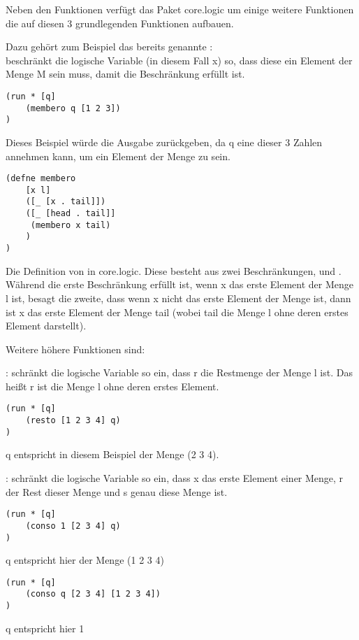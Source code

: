 Neben den Funktionen  verfügt das Paket core.logic um einige weitere Funktionen die auf diesen 3 grundlegenden Funktionen aufbauen.

Dazu gehört zum Beispiel das bereits genannte :\\
 beschränkt die logische Variable (in diesem Fall x) so, dass diese ein Element der Menge M sein muss, damit die Beschränkung erfüllt ist.\\
\begin{lstlisting}
(run * [q]
	(membero q [1 2 3])
)
\end{lstlisting}
Dieses Beispiel würde die Ausgabe  zurückgeben, da q eine dieser 3 Zahlen annehmen kann, um ein Element der Menge \code{[1 2 3]} zu sein.

\begin{lstlisting}
(defne membero
	[x l]
	([_ [x . tail]])
	([_ [head . tail]]
	 (membero x tail)
	)
)
\end{lstlisting}

Die Definition von  in core.logic. Diese besteht aus zwei Beschränkungen, \code{([\_ [x . tail]])} und . Während die erste Beschränkung erfüllt ist, wenn x das erste Element der Menge l ist, besagt die zweite, dass wenn x nicht das erste Element der Menge ist, dann ist x das erste Element der Menge tail (wobei tail die Menge l ohne deren erstes Element darstellt).

Weitere höhere Funktionen sind:
\begin{description}
\item{:}
 schränkt die logische Variable so ein, dass r die Restmenge der Menge l ist. Das heißt r ist die Menge l ohne deren erstes Element.
\begin{lstlisting}
(run * [q]
	(resto [1 2 3 4] q)
)
\end{lstlisting}
q entspricht in diesem Beispiel der Menge (2 3 4).
\item{:}
 schränkt die logische Variable so ein, dass x das erste Element einer Menge, r der Rest dieser Menge und s genau diese Menge ist.

\begin{lstlisting}
(run * [q]
	(conso 1 [2 3 4] q)
)
\end{lstlisting}
q entspricht hier der Menge (1 2 3 4)

\begin{lstlisting}
(run * [q]
	(conso q [2 3 4] [1 2 3 4])
)
\end{lstlisting}
q entspricht hier 1
\end{description}
